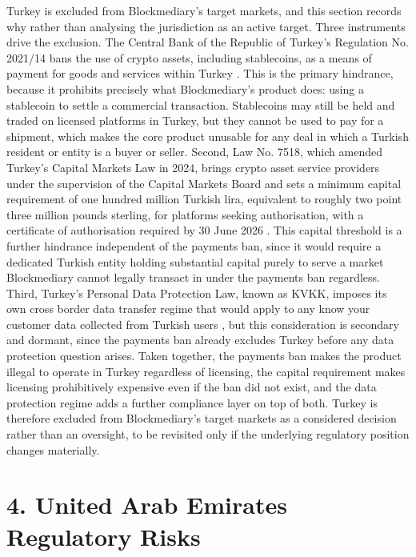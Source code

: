 \documentclass[12pt, a4paper]{article}
\begin{document}
Turkey is excluded from Blockmediary's target markets, and this section records why
rather than analysing the jurisdiction as an active target. Three instruments drive the
exclusion. The Central Bank of the Republic of Turkey's Regulation No. 2021/14 bans the
use of crypto assets, including stablecoins, as a means of payment for goods and services
within Turkey \citep{cbrt202114}. This is the primary hindrance, because it prohibits
precisely what Blockmediary's product does: using a stablecoin to settle a commercial
transaction. Stablecoins may still be held and traded on licensed platforms in Turkey,
but they cannot be used to pay for a shipment, which makes the core product unusable for
any deal in which a Turkish resident or entity is a buyer or seller. Second, Law No. 7518,
which amended Turkey's Capital Markets Law in 2024, brings crypto asset service providers
under the supervision of the Capital Markets Board and sets a minimum capital requirement
of one hundred million Turkish lira, equivalent to roughly two point three million pounds
sterling, for platforms seeking authorisation, with a certificate of authorisation
required by 30 June 2026 \citep{cmblaw7518}. This capital threshold is a further hindrance
independent of the payments ban, since it would require a dedicated Turkish entity holding
substantial capital purely to serve a market Blockmediary cannot legally transact in under
the payments ban regardless. Third, Turkey's Personal Data Protection Law, known as
KVKK, imposes its own cross border data transfer regime that would apply to any know your
customer data collected from Turkish users \citep{kvkk6698}, but this consideration is
secondary and dormant, since the payments ban already excludes Turkey before any data
protection question arises. Taken together, the payments ban makes the product illegal to
operate in Turkey regardless of licensing, the capital requirement makes licensing
prohibitively expensive even if the ban did not exist, and the data protection regime adds
a further compliance layer on top of both. Turkey is therefore excluded from
Blockmediary's target markets as a considered decision rather than an oversight, to be
revisited only if the underlying regulatory position changes materially.

\section*{4. United Arab Emirates Regulatory Risks}
\end{document}
